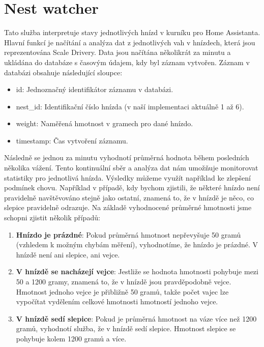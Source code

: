 \section{Nest watcher}\label{sec:nest-watcher}
Tato služba interpretuje stavy jednotlivých hnízd v kurníku pro Home Assistanta.
Hlavní funkcí je načítání a analýza dat z jednotlivých vah v hnízdech, která jsou reprezentována Scale Drivery.\newline
Data jsou načítána několikrát za minutu a ukládána do databáze s časovým údajem, kdy byl záznam vytvořen.
Záznam v databázi obsahuje následující sloupce:
\begin{itemize}
    \item id: Jednoznačný identifikátor záznamu v databázi.
    \item nest\_id: Identifikační číslo hnízda (v naší implementaci aktuálně 1 až 6).
    \item weight: Naměřená hmotnost v gramech pro dané hnízdo.
    \item timestamp: Čas vytvoření záznamu.
\end{itemize}
Následně se jednou za minutu vyhodnotí průměrná hodnota během posledních několika vážení.
Tento kontinuální sběr a analýza dat nám umožňuje monitorovat statistiky pro jednotlivá hnízda.
Výsledky můžeme využít například ke zlepšení podmínek chovu.
Například v případě, kdy bychom zjistili, že některé hnízdo není pravidelně navštěvováno stejně jako ostatní, znamená to, že v hnízdě je něco, co slepice pravidelně odrazuje.\newline
\newline
Na základě vyhodnocené průměrné hmotnosti jsme schopni zjistit několik případů:
\begin{enumerate}
    \item \textbf{Hnízdo je prázdné}: Pokud průměrná hmotnost nepřevyšuje 50 gramů (vzhledem k možným chybám měření), vyhodnotíme, že hnízdo je prázdné.
    V hnízdě není ani slepice, ani vejce.
    \item \textbf{V hnízdě se nacházejí vejce}: Jestliže se hodnota hmotnosti pohybuje mezi 50 a 1200 gramy, znamená to, že v hnízdě jsou pravděpodobně vejce.
    Hmotnost jednoho vejce je přibližně 50 gramů, takže počet vajec lze vypočítat vydělením celkové hmotnosti hmotností jednoho vejce.
    \item \textbf{V hnízdě sedí slepice}: Pokud je průměrná hmotnost na váze více než 1200 gramů, vyhodnotí služba, že v hnízdě sedí slepice.
    Hmotnost slepice se pohybuje kolem 1200 gramů a více.
\end{enumerate}

